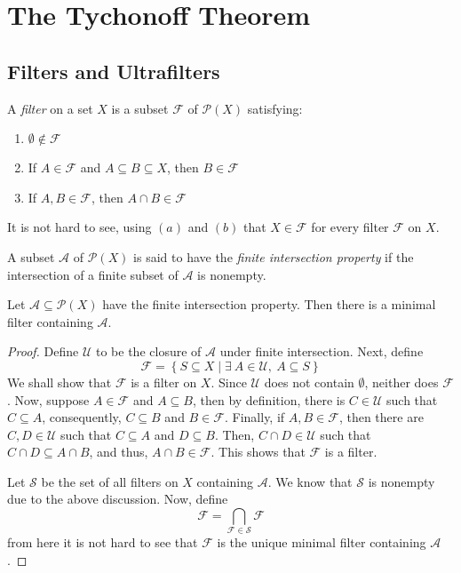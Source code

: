 \section{The Tychonoff Theorem}
\subsection{Filters and Ultrafilters}

\begin{definition}[Filter]
    A \textit{filter} on a set $X$ is a subset $\mathcal F$ of $\mathcal P(X)$ satisfying: 
    \begin{enumerate}[label=(\alph*)]
        \item $\emptyset\notin\mathcal F$
        \item If $A\in\mathcal F$ and $A\subseteq B\subseteq X$, then $B\in\mathcal F$
        \item If $A,B\in\mathcal F$, then $A\cap B\in\mathcal F$
    \end{enumerate}
\end{definition}

It is not hard to see, using $(a)$ and $(b)$ that $X\in\mathcal F$ for every filter $\mathcal F$ on $X$.

A subset $\mathscr A$ of $\mathcal P(X)$ is said to have the \textit{finite intersection property} if the intersection of a finite subset of $\mathscr A$ is nonempty.

\begin{lemma}
    Let $\mathscr A\subseteq\mathcal P(X)$ have the finite intersection property. Then there is a minimal filter containing $\mathscr A$.
\end{lemma}
\begin{proof}
    Define $\mathscr U$ to be the closure of $\mathscr A$ under finite intersection. Next, define 
    \begin{equation*}
    \mathcal F = \left\{S\subseteq X\mid\exists~A\in\mathscr U,~A\subseteq S\right\}
    \end{equation*}
    We shall show that $\mathcal F$ is a filter on $X$. Since $\mathscr U$ does not contain $\emptyset$, neither does $\mathcal F$. Now, suppose $A\in\mathcal F$ and $A\subseteq B$, then by definition, there is $C\in\mathscr U$ such that $C\subseteq A$, consequently, $C\subseteq B$ and $B\in\mathcal F$. Finally, if $A,B\in\mathcal F$, then there are $C,D\in\mathcal U$ such that $C\subseteq A$ and $D\subseteq B$. Then, $C\cap D\in\mathcal U$ such that $C\cap D\subseteq A\cap B$, and thus, $A\cap B\in\mathcal F$. This shows that $\mathcal F$ is a filter.

    Let $\mathscr S$ be the set of all filters on $X$ containing $\mathscr A$. We know that $\mathscr S$ is nonempty due to the above discussion. Now, define 
    \begin{equation*}
        \mathscr F = \bigcap_{\mathcal F\in\mathscr S} \mathcal F
    \end{equation*}
    from here it is not hard to see that $\mathscr F$ is the unique minimal filter containing $\mathscr A$.
\end{proof}

